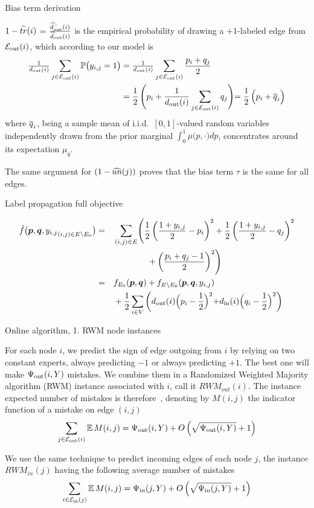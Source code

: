 \documentclass[10pt,svgnames,ignorenonframetext,final]{beamer}
\begin{document}
\appendix

\begin{frame}{Bias term derivation}
  
\(1-\widehat{tr}(i)\) = \(\frac{\widehat{d}_{\mathrm{out}}^-(i)}{\widehat{d}_{\mathrm{out}}(i)}\) is the empirical
probability of drawing a \(+1\)-labeled edge from \(\mathcal{E}_{\mathrm{out}}(i)\), which
according to our model is
\begin{align*}
  \tfrac{1}{d_{\mathrm{out}}(i)}\sum_{j\in \mathcal{E}_{\mathrm{out}}(i)} \mathbb{P}\big( y_{i,j} = 1 \big) &=
  \tfrac{1}{d_{\mathrm{out}}(i)}\sum_{j\in \mathcal{E}_{\mathrm{out}}(i)} \frac{p_i + q_j}{2} \\ &=
\frac{1}{2}\,\Biggl(p_i + \frac{1}{d_{\mathrm{out}}(i)}\sum_{j\in \mathcal{E}_{\mathrm{out}}(i)} q_j \Biggl)=
\frac{1}{2}\,\Bigl(p_i + \overline{q}_i\Bigl)
\end{align*}
where \(\overline{q}_i\), being a
sample mean of i.i.d.~\([0,1]\)-valued random variables independently
drawn from the prior marginal \(\int_0^1 \mu\big(p,\cdot\big) dp\),
concentrates around its expectation \(\mu_q\).

The same argument for $(1-\widehat{un}(j))$ proves that
the bias term \(\tau\) is the same for all edges.
\end{frame}

\begin{frame}{Label propagation full objective}

\begin{alignat*}{5}
{\hat f}\big(\boldsymbol{p},\boldsymbol{q},{y_{i,j}}_{(i,j) \in E\setminus E_0}\big) 
&= &&\sum_{(i,j) \in E} 
\Biggl(
  \frac{1}{2}\left(\frac{1+y_{i,j}}{2}-p_i\right)^2 +
  \frac{1}{2}\left(\frac{1+y_{i,j}}{2}-q_j\right)^2 \\
  &\, &&\qquad\qquad+ \left(\frac{p_i+q_j-1}{2}\right)^2
\Biggr)\\
&= &&f_{E_0}(\boldsymbol{p},\boldsymbol{q}) + f_{E\setminus E_0}(\boldsymbol{p},\boldsymbol{q}, {y_{i,j}}) \\
&\, &&+ \frac{1}{2}\sum_{i\in V}
\left(d_{\mathrm{out}}(i)\Bigl(p_i-\frac{1}{2}\Bigl)^2+d_{\mathrm{in}}(i)\Bigl(q_i-\frac{1}{2}\Bigl)^2\right) 
\end{alignat*}

\end{frame}


\begin{frame}{Online algorithm, 1. RWM node instances}

For each node \(i\), we predict the sign of edge outgoing from \(i\) by
relying on two constant experts, always predicting \(-1\) or always
predicting \(+1\). The best one will make \(\Psi_{\mathrm{out}}(i, Y)\) mistakes. We
combine them in a Randomized Weighted Majority algorithm (RWM) instance
associated with \(i\), call it \(RWM_{out}(i)\). The instance expected
number of mistakes is therefore~\autocite{acg02},
denoting by \(M(i,j)\) the indicator function of a mistake on edge
\((i,j)\)
\[\sum_{j \in \mathcal{E}_{\mathrm{out}}(i)} \mathbb{E}\,M(i,j) = \Psi_{\mathrm{out}}(i,Y) + O\left(\sqrt{\Psi_{\mathrm{out}}(i,Y)}+ 1\right)\]

We use the same technique to predict incoming edges of each node \(j\),
the instance \(RWM_{in}(j)\) having the following average number of
mistakes
\[\sum_{i \in \mathcal{E}_{\mathrm{in}}(j)} \mathbb{E}\,M(i,j) = \Psi_{\mathrm{in}}(j,Y) + O\left(\sqrt{\Psi_{\mathrm{in}}(j,Y)} + 1\right)\]

\end{frame}
\end{document}
